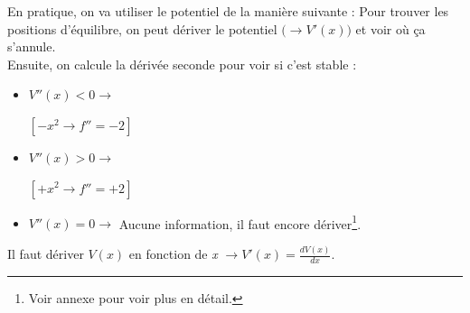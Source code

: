 \documentclass[a4paper]{article}
\begin{document}
\begin{tcolorbox}[title=\textcolor{black}{G. Étude de la stabilité - Méthode des petites perturbations}, colback=white, colframe=sprinen, sharp corners]
\end{tcolorbox}





En pratique, on va utiliser le potentiel de la manière suivante : Pour trouver les positions d'équilibre, on peut dériver le potentiel $ \big( \rightarrow V'(x) \big) $ et voir où ça s'annule. \\
Ensuite, on calcule la dérivée seconde pour voir si c'est stable : 
\begin{itemize}
\item $ V''(x) < 0 \longrightarrow $ \;  \; $ [ - x^2 \rightarrow f'' = - 2 ] $
\item $ V''(x) > 0 \longrightarrow $ \;  \; $ [ + x^2 \rightarrow f'' = + 2 ] $
\item $ V''(x) = 0 \longrightarrow $ Aucune information, il faut encore dériver\footnote{Voir annexe pour voir plus en détail.}.
\end{itemize}
\danger Il faut dériver $ V(x) $ en fonction de \emph{x} $\displaystyle \longrightarrow V'(x) = \frac{d V(x)}{d x} $.
\end{document}
